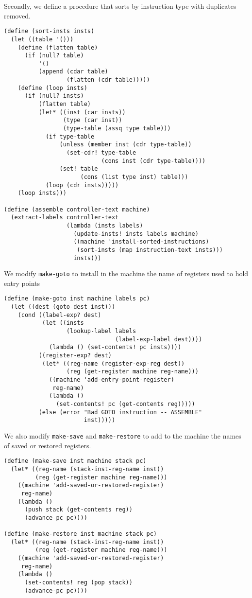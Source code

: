 \documentclass[a4paper,12pt]{article}
\begin{document}
Secondly, we define a procedure that sorts by instruction type with
duplicates removed.

\begin{lstlisting}
(define (sort-insts insts)
  (let ((table '()))
    (define (flatten table)
      (if (null? table)
          '()
          (append (cdar table)
                  (flatten (cdr table)))))
    (define (loop insts)
      (if (null? insts)
          (flatten table)
          (let* ((inst (car insts))
                 (type (car inst))
                 (type-table (assq type table)))
            (if type-table
                (unless (member inst (cdr type-table))
                  (set-cdr! type-table
                            (cons inst (cdr type-table))))
                (set! table
                      (cons (list type inst) table)))
            (loop (cdr insts)))))
    (loop insts)))

(define (assemble controller-text machine)
  (extract-labels controller-text
                  (lambda (insts labels)
                    (update-insts! insts labels machine)
                    ((machine 'install-sorted-instructions)
                     (sort-insts (map instruction-text insts)))
                    insts)))
\end{lstlisting}

We modify \lstinline!make-goto! to install in the machine the name of
registers used to hold entry points

\begin{lstlisting}
(define (make-goto inst machine labels pc)
  (let ((dest (goto-dest inst)))
    (cond ((label-exp? dest)
           (let ((insts
                  (lookup-label labels
                                (label-exp-label dest))))
             (lambda () (set-contents! pc insts))))
          ((register-exp? dest)
           (let* ((reg-name (register-exp-reg dest))
                  (reg (get-register machine reg-name)))
             ((machine 'add-entry-point-register)
              reg-name)
             (lambda ()
               (set-contents! pc (get-contents reg)))))
          (else (error "Bad GOTO instruction -- ASSEMBLE"
                       inst)))))
\end{lstlisting}

We also modify \lstinline!make-save! and \lstinline!make-restore! to
add to the machine the names of saved or restored registers.

\begin{lstlisting}
(define (make-save inst machine stack pc)
  (let* ((reg-name (stack-inst-reg-name inst))
         (reg (get-register machine reg-name)))
    ((machine 'add-saved-or-restored-register)
     reg-name)
    (lambda ()
      (push stack (get-contents reg))
      (advance-pc pc))))

(define (make-restore inst machine stack pc)
  (let* ((reg-name (stack-inst-reg-name inst))
         (reg (get-register machine reg-name)))
    ((machine 'add-saved-or-restored-register)
     reg-name)
    (lambda ()
      (set-contents! reg (pop stack))
      (advance-pc pc))))
\end{lstlisting}
\end{document}
